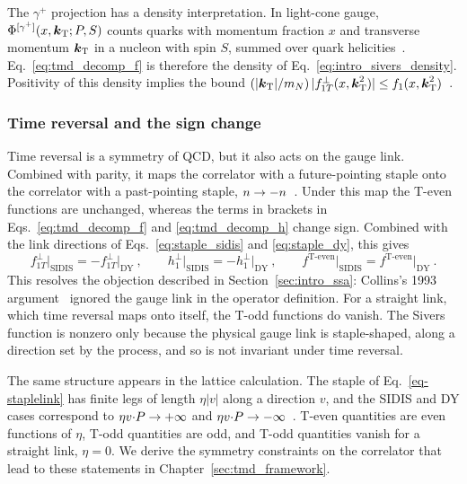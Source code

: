 The $\gamma^+$ projection has a density interpretation. In light-cone gauge, $\Phi^{[\gamma^+]}(x,\boldsymbol{k}_{\mathrm T};P,S)$ counts quarks with momentum fraction $x$ and transverse momentum $\boldsymbol{k}_{\mathrm T}$ in a nucleon with spin $S$, summed over quark helicities~\cite{CollinsBook2011,Collins:2003fm}. Eq.~\eqref{eq:tmd_decomp_f} is therefore the density of Eq.~\eqref{eq:intro_sivers_density}. Positivity of this density implies the bound $(|\boldsymbol{k}_{\mathrm T}|/m_N)\,|f_{1T}^\perp(x,\boldsymbol{k}_{\mathrm T}^2)| \le f_1(x,\boldsymbol{k}_{\mathrm T}^2)$~\cite{Bacchetta:1999kz}.

\subsubsection{Time reversal and the sign change}

Time reversal is a symmetry of QCD, but it also acts on the gauge link. Combined with parity, it maps the correlator with a future-pointing staple onto the correlator with a past-pointing staple, $n\to-n$~\cite{Collins:2002kn,Boer:2003cm}. Under this map the T-even functions are unchanged, whereas the terms in brackets in Eqs.~\eqref{eq:tmd_decomp_f} and \eqref{eq:tmd_decomp_h} change sign. Combined with the link directions of Eqs.~\eqref{eq:staple_sidis} and \eqref{eq:staple_dy}, this gives
\begin{equation}
  f_{1T}^\perp\big|_{\text{SIDIS}} = -f_{1T}^\perp\big|_{\text{DY}}\ ,\qquad
  h_{1}^\perp\big|_{\text{SIDIS}} = -h_{1}^\perp\big|_{\text{DY}}\ ,\qquad
  f^{\text{T-even}}\big|_{\text{SIDIS}} = f^{\text{T-even}}\big|_{\text{DY}} \ .
  \label{eq:sign_change_all}
\end{equation}
This resolves the objection described in Section~\ref{sec:intro_ssa}: Collins's 1993 argument~\cite{Collins:1992kk} ignored the gauge link in the operator definition. For a straight link, which time reversal maps onto itself, the T-odd functions do vanish. The Sivers function is nonzero only because the physical gauge link is staple-shaped, along a direction set by the process, and so is not invariant under time reversal.

The same structure appears in the lattice calculation. The staple of Eq.~\eqref{eq-staplelink} has finite legs of length $\eta|v|$ along a direction $v$, and the SIDIS and DY cases correspond to $\eta v{\cdot} P \to +\infty$ and $\eta v{\cdot} P\to -\infty$~\cite{Musch:2011er}. T-even quantities are even functions of $\eta$, T-odd quantities are odd, and T-odd quantities vanish for a straight link, $\eta = 0$. We derive the symmetry constraints on the correlator that lead to these statements in Chapter~\ref{sec:tmd_framework}.

